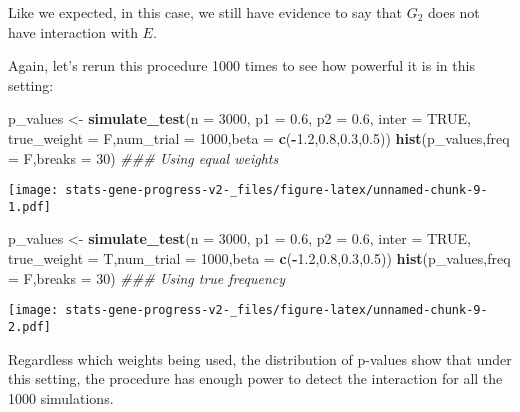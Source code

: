 \documentclass[]{article}
\newenvironment{Shaded}{\begin{snugshade}}{\end{snugshade}}
\newcommand{\CommentTok}[1]{\textcolor[rgb]{0.56,0.35,0.01}{\textit{#1}}}
\newcommand{\DataTypeTok}[1]{\textcolor[rgb]{0.13,0.29,0.53}{#1}}
\newcommand{\DecValTok}[1]{\textcolor[rgb]{0.00,0.00,0.81}{#1}}
\newcommand{\FloatTok}[1]{\textcolor[rgb]{0.00,0.00,0.81}{#1}}
\newcommand{\KeywordTok}[1]{\textcolor[rgb]{0.13,0.29,0.53}{\textbf{#1}}}
\newcommand{\NormalTok}[1]{#1}
\newcommand{\OperatorTok}[1]{\textcolor[rgb]{0.81,0.36,0.00}{\textbf{#1}}}
\newcommand{\OtherTok}[1]{\textcolor[rgb]{0.56,0.35,0.01}{#1}}
\newcommand{\StringTok}[1]{\textcolor[rgb]{0.31,0.60,0.02}{#1}}
\begin{document}
Like we expected, in this case, we still have evidence to say that
\(G_2\) does not have interaction with \(E\).

Again, let's rerun this procedure 1000 times to see how powerful it is
in this setting:

\begin{Shaded}
\begin{Highlighting}[]
\NormalTok{p_values <-}\StringTok{ }\KeywordTok{simulate_test}\NormalTok{(}\DataTypeTok{n =} \DecValTok{3000}\NormalTok{, }\DataTypeTok{p1 =} \FloatTok{0.6}\NormalTok{, }\DataTypeTok{p2 =} \FloatTok{0.6}\NormalTok{, }\DataTypeTok{inter =} \OtherTok{TRUE}\NormalTok{, }\DataTypeTok{true_weight =}\NormalTok{ F,}\DataTypeTok{num_trial =} \DecValTok{1000}\NormalTok{,}\DataTypeTok{beta =} \KeywordTok{c}\NormalTok{(}\OperatorTok{-}\FloatTok{1.2}\NormalTok{,}\FloatTok{0.8}\NormalTok{,}\FloatTok{0.3}\NormalTok{,}\FloatTok{0.5}\NormalTok{))}
\KeywordTok{hist}\NormalTok{(p_values,}\DataTypeTok{freq =}\NormalTok{ F,}\DataTypeTok{breaks =} \DecValTok{30}\NormalTok{) }\CommentTok{### Using equal weights}
\end{Highlighting}
\end{Shaded}

\texttt{[image: stats-gene-progress-v2-\_files/figure-latex/unnamed-chunk-9-1.pdf]}

\begin{Shaded}
\begin{Highlighting}[]
\NormalTok{p_values <-}\StringTok{ }\KeywordTok{simulate_test}\NormalTok{(}\DataTypeTok{n =} \DecValTok{3000}\NormalTok{, }\DataTypeTok{p1 =} \FloatTok{0.6}\NormalTok{, }\DataTypeTok{p2 =} \FloatTok{0.6}\NormalTok{, }\DataTypeTok{inter =} \OtherTok{TRUE}\NormalTok{, }\DataTypeTok{true_weight =}\NormalTok{ T,}\DataTypeTok{num_trial =} \DecValTok{1000}\NormalTok{,}\DataTypeTok{beta =} \KeywordTok{c}\NormalTok{(}\OperatorTok{-}\FloatTok{1.2}\NormalTok{,}\FloatTok{0.8}\NormalTok{,}\FloatTok{0.3}\NormalTok{,}\FloatTok{0.5}\NormalTok{))}
\KeywordTok{hist}\NormalTok{(p_values,}\DataTypeTok{freq =}\NormalTok{ F,}\DataTypeTok{breaks =} \DecValTok{30}\NormalTok{) }\CommentTok{### Using true frequency}
\end{Highlighting}
\end{Shaded}

\texttt{[image: stats-gene-progress-v2-\_files/figure-latex/unnamed-chunk-9-2.pdf]}

Regardless which weights being used, the distribution of p-values show
that under this setting, the procedure has enough power to detect the
interaction for all the 1000 simulations.
\end{document}
